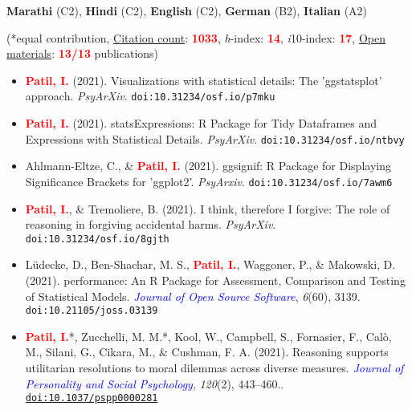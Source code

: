 \documentclass[10pt]{article}
\begin{document}
	\textbf{Marathi} (C2), \textbf{Hindi} (C2), \textbf{English} (C2), \textbf{German} (B2), \textbf{Italian} (A2)
	

	\begin{center}
	(*equal contribution, \href{https://scholar.google.it/citations?user=kSYuYTUAAAAJ&hl=en&oi=ao}{Citation count}: \textbf{\textcolor{red}{1033}}, \textit{h}-index: \textbf{\textcolor{red}{14}}, \textit{i}10-index: \textbf{\textcolor{red}{17}}, \href{https://osf.io/hk5f3/}{Open materials}: \textbf{\textcolor{red}{13/13}} publications)
	\end{center}
	
	\begin{itemize}

	\item \textbf{\textcolor{red}{Patil, I.}} (2021). Visualizations with statistical details: The 'ggstatsplot' approach. \textit{PsyArXiv}. {\tt doi:10.31234/osf.io/p7mku}

	\item \textbf{\textcolor{red}{Patil, I.}} (2021). statsExpressions: R Package for Tidy Dataframes and Expressions with Statistical Details. \textit{PsyArXiv}. {\tt doi:10.31234/osf.io/ntbvy}

	\item Ahlmann-Eltze, C., \& \textbf{\textcolor{red}{Patil, I.}} (2021). ggsignif: R Package for Displaying Significance Brackets for 'ggplot2'. \textit{PsyArxiv}. {\tt doi:10.31234/osf.io/7awm6}

	\item \textbf{\textcolor{red}{Patil, I.}}, \& Tremoliere, B. (2021). I think, therefore I forgive: The role of reasoning in forgiving accidental harms. \textit{PsyArXiv}. {\tt doi:10.31234/osf.io/8gjth}

	\item Lüdecke, D., Ben-Shachar,  M. S., \textbf{\textcolor{red}{Patil, I.}}, Waggoner, P., \& Makowski, D. (2021). performance: An R Package for Assessment, Comparison and Testing of Statistical Models. \textit{\textcolor{blue}{Journal of Open Source Software}}, \textit{6}(60), 3139. {\tt doi:10.21105/joss.03139}
	
	\item \textbf{\textcolor{red}{Patil, I.}}*, Zucchelli, M. M.*, Kool, W., Campbell, S., Fornasier, F., Cal\`{o}, M., Silani, G., Cikara, M., \& Cushman, F. A. (2021). Reasoning supports utilitarian resolutions to moral dilemmas across diverse measures. \textit{\textcolor{blue}{Journal of Personality and Social Psychology}}, \textit{120}(2), 443–460.. \href{https://www.researchgate.net/publication/338496843_Reasoning_supports_utilitarian_resolutions_to_moral_dilemmas_across_diverse_measures}{\tt doi:10.1037/pspp0000281}
	

\end{itemize}
\end{document}
